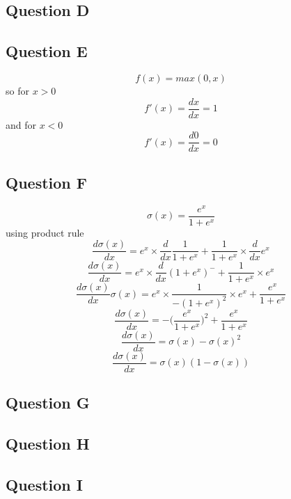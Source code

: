 \documentclass[11pt]{article}
\begin{document}
\subsection {Question D}
\subsection {Question E}
$$f(x) = max(0,x)$$
so for $x > 0$
$$f'(x) = \frac {dx} {dx} = 1$$
and for $x < 0$
$$f'(x) =\frac{d0}{dx} = 0$$

\subsection {Question F}
$$\sigma(x) = \frac {e^x} {1 + e^x}$$
using product rule
$$\frac {d\sigma(x)}{dx} = e^x \times \frac d {dx} \frac 1 {1 + e^x} + \frac 1 {1 + e^x} \times \frac {d}{dx} e^x$$
$$\frac {d\sigma(x)}{dx} = e^x \times \frac d {dx} (1 + e^x)^- + \frac 1 {1 + e^x} \times e^x$$
$$\frac {d\sigma(x)}{dx}\sigma(x) = e^x \times \frac 1 {-(1 + e^x)^{2}} \times e^x + \frac {e^x} {1 + e^x}$$
$$\frac {d\sigma(x)}{dx} = -\bigg( \frac {e^x} {1 + e^x} \bigg)^2 + \frac {e^x} {1 + e^x}$$
$$\frac {d\sigma(x)}{dx} = \sigma(x) - \sigma(x)^2$$
$$\frac {d\sigma(x)}{dx} = \sigma(x)(1 - \sigma(x))$$

\subsection {Question G}
\subsection {Question H}
\subsection {Question I}



\end{document}
